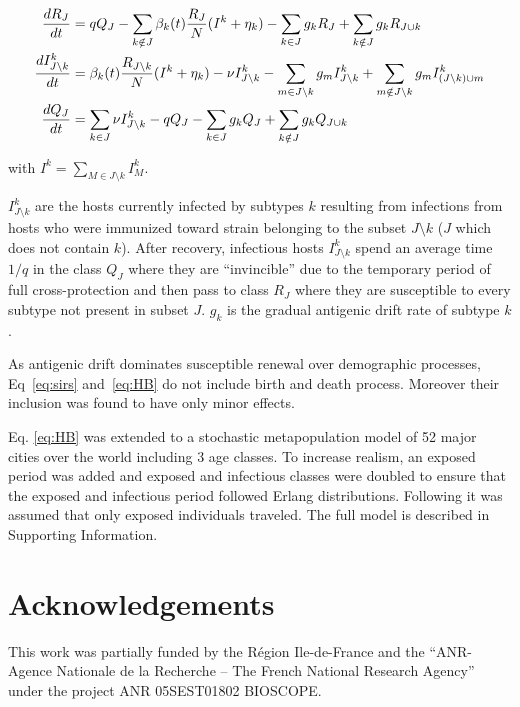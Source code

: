 \begin{footnotesize}
  \begin{align}
    \label{eq:HB}
    \frac{dR_J}{dt} &= q Q_J - \sum_{k \notin J} \beta_k(t)
    \frac{R_{J}}{N} (I^k+\eta_k) -\sum_{k \in J} g_k R_{J} + \sum_{k
      \notin J} g_k
    R_{J \cup k } \\
    \frac{dI^k_{J \setminus k}}{dt} &= \beta_k(t) \frac{R_{J \setminus
        k}}{N} (I^k+\eta_k) - \nu I^k_{J \setminus k} -\sum_{m \in J
      \setminus k} g_m I^k_{J \setminus k} + \sum_{m \notin J
      \setminus k} g_m I^k_{(J \setminus k) \cup m}
    \notag \\
    \frac{dQ_J}{dt} &= \sum_{k \in J} \nu I^k_{J \setminus k} - q Q_J
    -\sum_{k \in J} g_k Q_{J} + \sum_{k \notin J} g_k Q_{J \cup k }
    \notag
  \end{align}
\end{footnotesize}

with $I^k=\sum_{M \in J \setminus k} I^k_M$.

$I^k_{J\setminus k}$ are the hosts currently infected by subtypes $k$
resulting from infections from hosts who were immunized toward strain
belonging to the subset $J \setminus k$ ($J$ which does not contain
$k$). After recovery, infectious hosts $I^k_{J\setminus k}$ spend an
average time $1/q$ in the class $Q_J$ where they are ``invincible''
due to the temporary period of full cross-protection and then pass to
class $R_J$ where they are susceptible to every subtype not present in
subset $J$. $g_k$ is the gradual antigenic drift rate of subtype $k$.

As antigenic drift dominates susceptible renewal over demographic
processes, Eq~\eqref{eq:sirs} and~\eqref{eq:HB} do not include birth
and death process. Moreover their inclusion was found to have only
minor effects.

Eq. \eqref{eq:HB} was extended to a stochastic metapopulation model of
52 major cities over the world including 3 age classes. To increase
realism, an exposed period was added and exposed and infectious
classes were doubled to ensure that the exposed and infectious period
followed Erlang distributions.  Following \citet{Cooper2006a} it was
assumed that only exposed individuals traveled. The full model is
described in Supporting Information.

\section*{Acknowledgements}
This work was partially funded by the R\'egion Ile-de-France and the
“ANR-Agence Nationale de la Recherche – The French National Research
Agency” under the project ANR 05SEST01802 BIOSCOPE.



